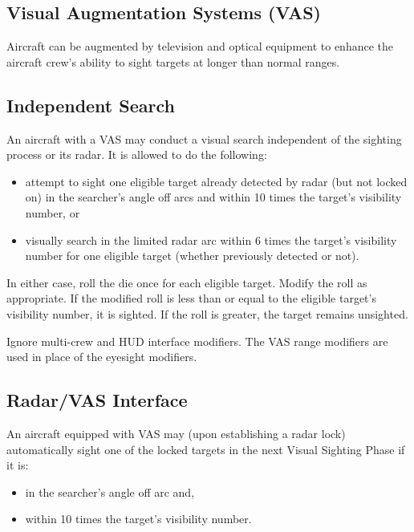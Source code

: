 \begin{advancedrules}

    \section{Visual Augmentation Systems (VAS)}
    \label{rule:vas}

    Aircraft can be augmented by television and optical equipment to enhance the aircraft crew's ability to sight targets at longer than normal ranges.

    \subsection{Independent Search} An aircraft with a VAS may conduct a visual search independent of the sighting process or its radar. It is allowed to do the following:

    \begin{itemize}

        \item attempt to sight one eligible target already detected by radar (but not locked on) in the searcher's  angle off arcs and within 10 times the target's visibility number, or

        \item visually search in the limited radar arc within 6 times the target's visibility number for one eligible target (whether previously detected or not).

    \end{itemize}

    In either case, roll the die once for each eligible target. Modify the roll as appropriate. If the modified roll is less than or equal to the eligible target's visibility number, it is sighted. If the roll is greater, the target remains unsighted.

    Ignore multi-crew and HUD interface modifiers. The VAS range modifiers are used in place of the eyesight modifiers.

    \subsection{Radar/VAS Interface} An aircraft equipped with VAS may (upon establishing a radar lock) automatically sight one of the locked targets in the next Visual Sighting Phase if it is:

    \begin{itemize}
        \item in the searcher's  angle off arc and,
        \item within 10 times the target's visibility number.
    \end{itemize}


\end{advancedrules}
